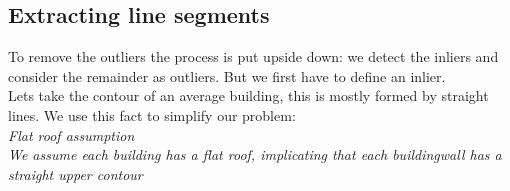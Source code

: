 \documentclass[10pt]{article}
\begin{document}



\subsection{Extracting line segments}
%


	To remove the outliers the process is put upside down: we detect the
	inliers and consider the remainder as outliers. But we first have to define an inlier.\\
	Lets take the contour of an average building, this is mostly formed by
	straight lines. We use this fact to simplify our problem:\\
	\emph{Flat roof assumption}\\
	\emph{We assume each building has a flat roof, implicating that each buildingwall
	has a straight upper contour}
\end{document}
